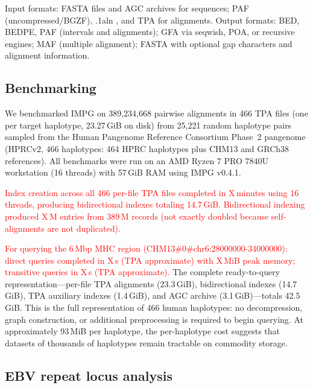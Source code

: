 Input formats: FASTA files and AGC archives \cite{deorowicz2023agc} for sequences; PAF (uncompressed/BGZF), .1aln \cite{myers2025fastga}, and TPA \cite{tpa} for alignments. Output formats: BED, BEDPE, PAF (intervals and alignments); GFA via seqwish, POA, or recursive engines; MAF (multiple alignment); FASTA with optional gap characters and alignment information.

\subsection*{Benchmarking}

We benchmarked IMPG on 389,234,668 pairwise alignments in 466 TPA files (one per target haplotype, 23.27\,GiB on disk) from 25,221 random haplotype pairs sampled from the Human Pangenome Reference Consortium Phase~2 pangenome (HPRCv2, 466 haplotypes: 464 HPRC haplotypes plus CHM13 and GRCh38 references). All benchmarks were run on an AMD Ryzen 7 PRO 7840U workstation (16 threads) with 57\,GiB RAM using IMPG v0.4.1.

\textcolor{red}{Index creation across all 466 per-file TPA files completed in X\,minutes using 16 threads, producing bidirectional indexes totaling 14.7\,GiB. Bidirectional indexing produced X\,M entries from 389\,M records (not exactly doubled because self-alignments are not duplicated).}

\textcolor{red}{For querying the 6\,Mbp MHC region (CHM13\#0\#chr6:28000000-34000000): direct queries completed in X\,s (TPA approximate) with X\,MiB peak memory; transitive queries in X\,s (TPA approximate).} The complete ready-to-query representation---per-file TPA alignments (23.3\,GiB), bidirectional indexes (14.7\,GiB), TPA auxiliary indexes (1.4\,GiB), and AGC archive (3.1\,GiB)---totals 42.5\,GiB. This is the full representation of 466 human haplotypes: no decompression, graph construction, or additional preprocessing is required to begin querying. At approximately 93\,MiB per haplotype, the per-haplotype cost suggests that datasets of thousands of haplotypes remain tractable on commodity storage.

\subsection*{EBV repeat locus analysis}

